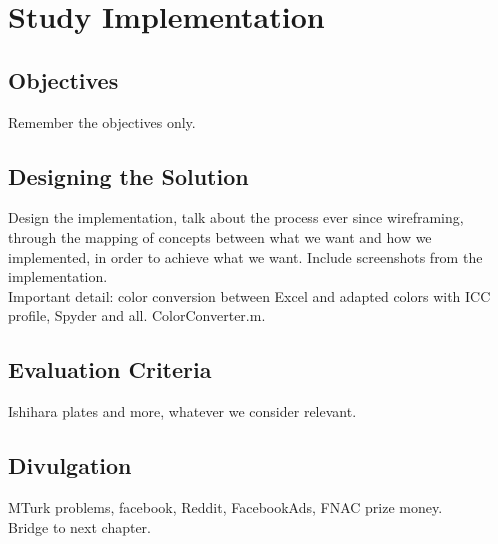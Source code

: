 
\chapter{Study Implementation}
\label{chapter:implementation}

\section{Objectives}
\label{sec:impl_objectives}
Remember the objectives only. \\

\section{Designing the Solution}
\label{sec:impl_designingsolution}
Design the implementation, talk about the process ever since wireframing, through the mapping of concepts between
what we want and how we implemented, in order to achieve what we want. Include screenshots from the implementation. \\

Important detail: color conversion between Excel and adapted colors with ICC profile, Spyder and all. ColorConverter.m.

\section{Evaluation Criteria}
\label{sec:impl_evaluationcriteria}
Ishihara plates and more, whatever we consider relevant. \\

\section{Divulgation}
\label{sec:impl_divulgation}
MTurk problems, facebook, Reddit, FacebookAds, FNAC prize money. \\

Bridge to next chapter.
